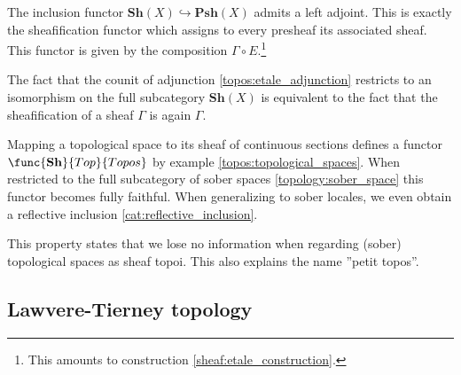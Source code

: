     \begin{property}
        The inclusion functor $\mathbf{Sh}(X)\hookrightarrow\mathbf{Psh}(X)$ admits a left adjoint. This is exactly the sheafification functor which assigns to every presheaf its associated sheaf. This functor is given by the composition $\Gamma\circ E$.\footnote{This amounts to construction \ref{sheaf:etale_construction}.}

        The fact that the counit of adjunction \ref{topos:etale_adjunction} restricts to an isomorphism on the full subcategory $\mathbf{Sh}(X)$ is equivalent to the fact that the sheafification of a sheaf $\Gamma$ is again $\Gamma$.
    \end{property}


    \begin{property}
        Mapping a topological space to its sheaf of continuous sections defines a functor $\func{\mathbf{Sh}}{Top}{Topos}$ by example \ref{topos:topological_spaces}. When restricted to the full subcategory of sober spaces \ref{topology:sober_space} this functor becomes fully faithful. When generalizing to sober locales, we even obtain a reflective inclusion \ref{cat:reflective_inclusion}.

        This property states that we lose no information when regarding (sober) topological spaces as sheaf topoi. This also explains the name ''petit topos''.
    \end{property}

\subsection{Lawvere-Tierney topology}

